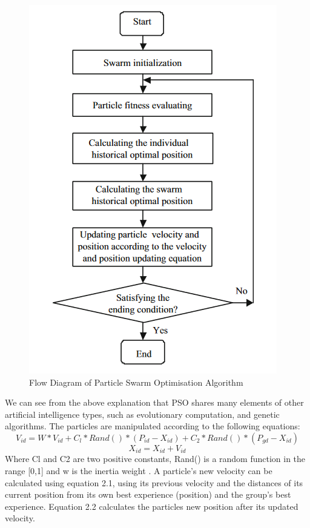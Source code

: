 \documentclass[oneside,12pt]{book}
\begin{document}
\begin{figure}[H]
    \centering
    \includegraphics[scale=0.6]{Images/PSO_Flow.png}
    \caption{Flow Diagram of Particle Swarm Optimisation Algorithm \protect\cite{wang_tan_liu_2017}}
    \label{fig:Flow Diagram of Particle Swarm Optimisation Algorithm}
\end{figure}

We can see from the above explanation that PSO shares many elements of other artificial intelligence types, such as evolutionary computation, and genetic algorithms. The particles are manipulated according to the following equations: 
\begin{equation}
V_{id} = W * V_{id} + C_l * Rand( ) * ( P_{id} - X_{id} ) + C_2 * Rand( ) * (P_{gd} - X_{id})
\end{equation}
\begin{equation}
X_{id} = X_{id} + V_{id}
\end{equation}
Where Cl and C2 are two positive constants, Rand() is a random function in the range [0,1] and w is the inertia weight \cite{shi1998parameter}. A particle's new velocity can be calculated using equation 2.1, using its previous velocity and the distances of its current position from its own best experience (position) and the group's best experience. Equation 2.2 calculates the particles new position after its updated velocity. 
\end{document}
